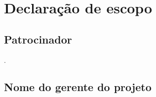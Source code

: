 \chapter{Declaração de escopo}

\section{Patrocinador}

\projectSponsorName.

\section{Nome do gerente do projeto}